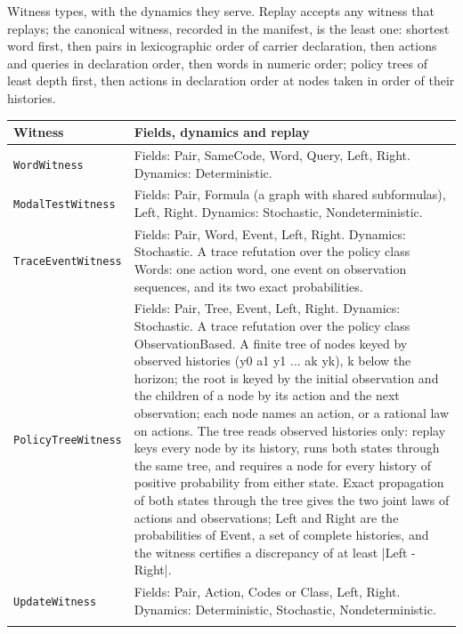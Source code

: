 \documentclass[11pt]{article}
\newcommand{\code}[1]{\texttt{#1}}
\theoremstyle{definition}
\theoremstyle{plain}
\begin{document}
Witness types, with the dynamics they serve. Replay accepts any witness that replays; the canonical witness,\allowbreak{} recorded in the manifest,\allowbreak{} is the least one: shortest word first,\allowbreak{} then pairs in lexicographic order of carrier declaration,\allowbreak{} then actions and queries in declaration order,\allowbreak{} then words in numeric order; policy trees of least depth first,\allowbreak{} then actions in declaration order at nodes taken in order of their histories.
{\footnotesize\begin{longtable}{>{\raggedright\arraybackslash}p{3.0cm}>{\raggedright\arraybackslash}p{11.4cm}}
\toprule Witness & Fields, dynamics and replay\\ \midrule \endhead
\code{WordWitness} & Fields: Pair, SameCode, Word, Query, Left, Right. Dynamics: Deterministic.\\ \addlinespace[3pt]
\code{ModalTestWitness} & Fields: Pair, Formula (a graph with shared subformulas), Left, Right. Dynamics: Stochastic, Nondeterministic.\\ \addlinespace[3pt]
\code{TraceEventWitness} & Fields: Pair, Word, Event, Left, Right. Dynamics: Stochastic. A trace refutation over the policy class Words: one action word,\allowbreak{} one event on observation sequences,\allowbreak{} and its two exact probabilities.\\ \addlinespace[3pt]
\code{PolicyTreeWitness} & Fields: Pair, Tree, Event, Left, Right. Dynamics: Stochastic. A trace refutation over the policy class ObservationBased. A finite tree of nodes keyed by observed histories (y0 a1 y1 ... ak yk),\allowbreak{} k below the horizon; the root is keyed by the initial observation and the children of a node by its action and the next observation; each node names an action,\allowbreak{} or a rational law on actions. The tree reads observed histories only: replay keys every node by its history,\allowbreak{} runs both states through the same tree,\allowbreak{} and requires a node for every history of positive probability from either state. Exact propagation of both states through the tree gives the two joint laws of actions and observations; Left and Right are the probabilities of Event,\allowbreak{} a set of complete histories,\allowbreak{} and the witness certifies a discrepancy of at least |\allowbreak{}Left - Right|\allowbreak{}.\\ \addlinespace[3pt]
\code{UpdateWitness} & Fields: Pair, Action, Codes or Class, Left, Right. Dynamics: Deterministic, Stochastic, Nondeterministic.\\ \addlinespace[3pt]

\end{longtable}}
\end{document}
